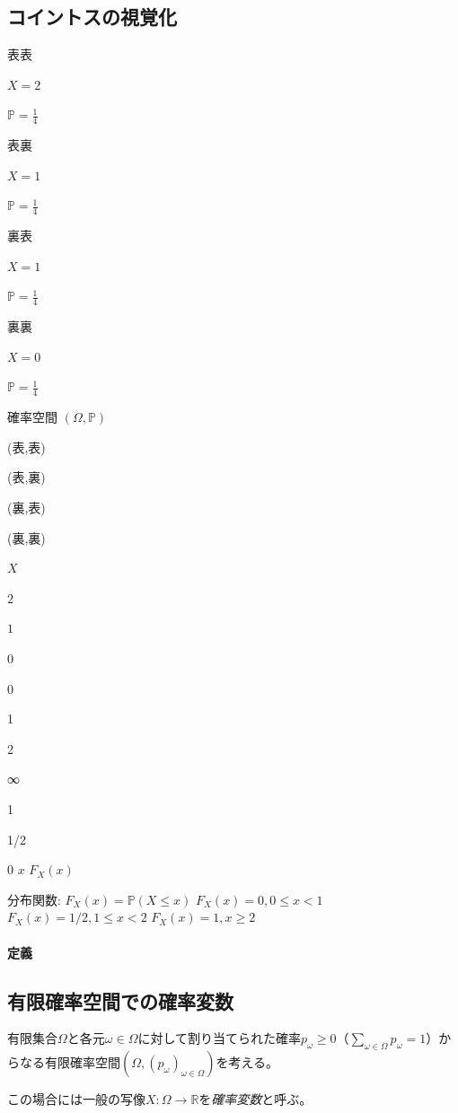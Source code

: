 \documentclass[uplatex,dvipdfmx,11pt,a4paper,openany]{bxjsbook}
\begin{document}
\subsection{コイントスの視覚化}
表表

$X = 2$

$\mathbb{P} = \frac{1}{4}$

表裏

$X = 1$

$\mathbb{P} = \frac{1}{4}$

裏表

$X = 1$

$\mathbb{P} = \frac{1}{4}$

裏裏

$X = 0$

$\mathbb{P} = \frac{1}{4}$

確率空間 $(\Omega, \mathbb{P})$

(表,表)

(表,裏)

(裏,表)

(裏,裏)

$X$


$2$

$1$

$0$

0

1

2

∞

1

1/2

0
$x$
$F_X(x)$









分布関数:
$F_X(x) = \mathbb{P}(X \leq x)$
$F_X(x) = 0, 0 \leq x < 1$
$F_X(x) = 1/2, 1 \leq x < 2$
$F_X(x) = 1, x \geq 2$

\paragraph{定義}
\subsection{有限確率空間での確率変数}
有限集合$\Omega$と各元$\omega\in\Omega$に対して割り当てられた確率$p_\omega\ge 0$（$\sum_{\omega\in\Omega}p_\omega=1$）からなる有限確率空間$(\Omega,(p_\omega)_{\omega\in\Omega})$を考える。

この場合には一般の写像$X:\Omega\to\mathbb{R}$を\emph{確率変数}と呼ぶ。
\end{document}

